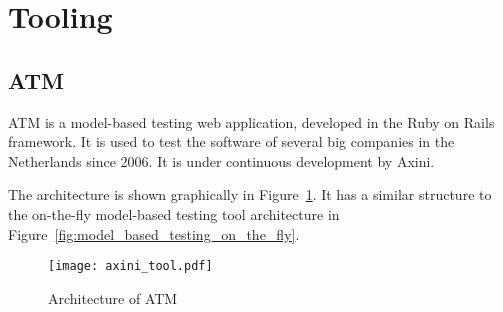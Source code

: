 \section{Tooling}\label{sec:tooling}

\subsection{ATM}\label{sec:atm}
ATM is a model-based testing web application, developed in the Ruby on Rails framework. It is used to test the software of several big companies in the Netherlands since 2006. It is under continuous development by Axini.

The architecture is shown graphically in Figure~\ref{fig:axini_tool}. It has a similar structure to the on-the-fly model-based testing tool architecture in Figure~\ref{fig:model_based_testing_on_the_fly}.

\begin{figure}[ht]
  \begin{center}
    \texttt{[image: axini\_tool.pdf]}
  \end{center}
  \caption{Architecture of ATM}
  \label{fig:axini_tool}
\end{figure}

